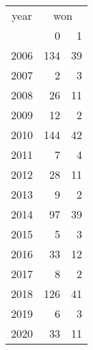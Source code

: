 \footnotesize\begin{tabular}[t]{lrr}
\toprule
\multicolumn{1}{c}{year} & \multicolumn{2}{c}{won} \\
\cmidrule(l{3pt}r{3pt}){1-1} \cmidrule(l{3pt}r{3pt}){2-3}
  & 0 & 1\\
\midrule
2006 & 134 & 39\\
2007 & 2 & 3\\
2008 & 26 & 11\\
2009 & 12 & 2\\
2010 & 144 & 42\\
2011 & 7 & 4\\
2012 & 28 & 11\\
2013 & 9 & 2\\
2014 & 97 & 39\\
2015 & 5 & 3\\
2016 & 33 & 12\\
2017 & 8 & 2\\
2018 & 126 & 41\\
2019 & 6 & 3\\
2020 & 33 & 11\\
\bottomrule
\end{tabular}
